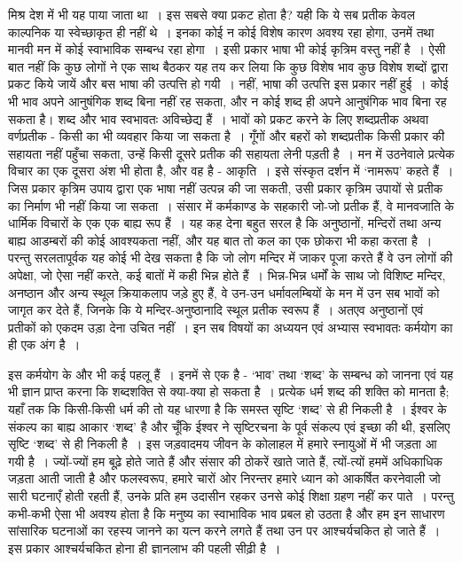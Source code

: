 मिश्र देश में भी यह पाया जाता था~। इस सबसे क्या प्रकट होता है? यही कि ये सब प्रतीक केवल काल्पनिक या स्वेच्छाकृत ही नहीं थे~। इनका कोई न कोई विशेष कारण अवश्य रहा होगा, उनमें तथा मानवी मन में कोई स्वाभाविक सम्बन्ध रहा होगा~। इसी प्रकार भाषा भी कोई कृत्रिम वस्तु नहीं है~। ऐसी बात नहीं कि कुछ लोगों ने एक साथ बैठकर यह तय कर लिया कि कुछ विशेष भाव कुछ विशेष शब्दों द्वारा प्रकट किये जायें और बस भाषा की उत्पत्ति हो गयी~। नहीं, भाषा की उत्पत्ति इस प्रकार नहीं हुई~। कोई भी भाव अपने आनुषंगिक शब्द बिना नहीं रह सकता, और न कोई शब्द ही अपने आनुषंगिक भाव बिना रह सकता है। शब्द और भाव स्वभावतः अविच्छेद्य हैं~। भावों को प्रकट करने के लिए शब्दप्रतीक अथवा वर्णप्रतीक - किसी का भी व्यवहार किया जा सकता है~। गूँगों और बहरों को शब्दप्रतीक किसी प्रकार की सहायता नहीं पहुँचा सकता, उन्हें किसी दूसरे प्रतीक की सहायता लेनी पड़ती है~। मन में उठनेवाले प्रत्येक विचार का एक दूसरा अंश भी होता है, और वह है - आकृति~। इसे संस्कृत दर्शन में ‘नामरूप’ कहते हैं~। जिस प्रकार कृत्रिम उपाय द्वारा एक भाषा नहीं उत्पन्न की जा सकती, उसी प्रकार कृत्रिम उपायों से प्रतीक का निर्माण भी नहीं किया जा सकता~। संसार में कर्मकाण्ड के सहकारी जो-जो प्रतीक हैं, वे मानवजाति के धार्मिक विचारों के एक एक बाह्य रूप हैं~। यह कह देना बहुत सरल है कि अनुष्ठानों, मन्दिरों तथा अन्य बाह्य आडम्बरों की कोई आवश्यकता नहीं, और यह बात तो कल का एक छोकरा भी कहा करता है~। परन्तु सरलतापूर्वक यह कोई भी देख सकता है कि जो लोग मन्दिर में जाकर पूजा करते हैं वे उन लोगों की अपेक्षा, जो ऐसा नहीं करते, कई बातों में कही भिन्न होते हैं~। भिन्न-भिन्न धर्मों के साथ जो विशिष्ट मन्दिर, अनष्ठान और अन्य स्थूल क्रियाकलाप जड़े हुए हैं, वे उन-उन धर्मावलम्बियों के मन में उन सब भावों को जागृत कर देते हैं, जिनके कि ये मन्दिर-अनुष्ठानादि स्थूल प्रतीक स्वरूप हैं~। अतएव अनुष्ठानों एवं प्रतीकों को एकदम उड़ा देना उचित नहीं~। इन सब विषयों का अध्ययन एवं अभ्यास स्वभावतः कर्मयोग का ही एक अंग है~।

इस कर्मयोग के और भी कई पहलू हैं~। इनमें से एक है - ‘भाव’ तथा ‘शब्द’ के सम्बन्ध को जानना एवं यह भी ज्ञान प्राप्त करना कि शब्दशक्ति से क्या-क्या हो सकता है~। प्रत्येक धर्म शब्द की शक्ति को मानता है; यहाँ तक कि किसी-किसी धर्म की तो यह धारणा है कि समस्त सृष्टि ‘शब्द’ से ही निकली है~। ईश्वर के संकल्प का बाह्य आकार ‘शब्द’ है और चूँकि ईश्वर ने सृष्टिरचना के पूर्व संकल्प एवं इच्छा की थी, इसलिए सृष्टि ‘शब्द’ से ही निकली है~। इस जड़वादमय जीवन के कोलाहल में हमारे स्नायुओं में भी जड़ता आ गयी है~। ज्यों-ज्यों हम बूढ़े होते जाते हैं और संसार की ठोकरें खाते जाते हैं, त्यों-त्यों हममें अधिकाधिक जड़ता आती जाती है और फलस्वरूप, हमारे चारों ओर निरन्तर हमारे ध्यान को आकर्षित करनेवाली जो सारी घटनाएँ होती रहती हैं, उनके प्रति हम उदासीन रहकर उनसे कोई शिक्षा ग्रहण नहीं कर पाते~। परन्तु कभी-कभी ऐसा भी अवश्य होता है कि मनुष्य का स्वाभाविक भाव प्रबल हो उठता है और हम इन साधारण सांसारिक घटनाओं का रहस्य जानने का यत्न करने लगते हैं तथा उन पर आश्चर्यचकित हो जाते हैं~। इस प्रकार आश्चर्यचकित होना ही ज्ञानलाभ की पहली सीढ़ी है~।

